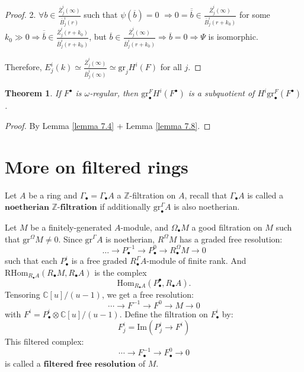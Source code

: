 \documentclass[openany]{book}
\newtheorem{theorem}{Theorem}[chapter] %
\theoremstyle{definition} %
\theoremstyle{remark}
\begin{document}
\begin{proof}
    2. $\forall b \in \frac{\overline{Z}_j^i(\infty)}{\overline{B}_j^i(r)}$ such that $\psi(\overline{b}) = 0$ $\Rightarrow0= \overline{\overline{b} }\in \frac{\overline{Z}_j^i(\infty)}{\overline{B}_j^i(r+k_0)}$ for some $k_0 \gg 0\Rightarrow \overline{\overline{b}} \in \frac{\overline{Z}_j^i(r+k_0)}{\overline{B}_j^i(r+k_0)}$, but $\overline{b} \in \frac{\overline{Z}_j^i(\infty)}{\overline{B}_j^i(r+k_0)} \Rightarrow \overline{b} = 0\Rightarrow \Psi$ is isomorphic.

    Therefore, $E_j^i(k)\simeq\frac{\overline{Z}^{i}_{j}(\infty)}{\overline{B}^{i}_{j}(\infty)} \simeq \mathrm{gr}_j H^i(F) $ for all $j$.
\end{proof}

\begin{theorem}\label{tehorem 7.9}
    If $F^\bullet$ is $\omega$-regular, then $\mathrm{gr}^F_{\bullet} H^{i}(F^{\bullet})$ is a subquotient of $H^{i} \mathrm{gr}^{F}_{\bullet }(F^{\bullet})$.
\end{theorem}
\begin{proof}
    By Lemma \ref{lemma 7.4} + Lemma \ref{lemma 7.8}.
\end{proof}

\section{More on filtered rings }

Let $A$ be a ring and $\Gamma_{\bullet} = \Gamma_{\bullet}A$ a $\mathbb{Z}$-filtration on $A$, recall that $\Gamma_{\bullet}A$ is called a $\textbf{noetherian } \mathbb{Z}\textbf{-filtration}$ if additionally $\mathrm{gr}^{\Gamma}_\bullet A$ is also noetherian.

Let $M$ be a finitely-generated $A$-module, and $\Omega_{\bullet}M$ a good filtration on $M$ such that $\mathrm{gr}^{\Omega} M \neq 0$.
Since $\mathrm{gr}^{\Gamma} A$ is noetherian, $R^{\Omega} M$ has a graded free resolution: $$\dots\rightarrow P_{\bullet}^{-1}\rightarrow P^{0}_{\bullet}\rightarrow R^{\Omega} _{\bullet}M\rightarrow0$$such that each $P^{i}_{\bullet}$ is a free graded $R_{\bullet}^{\Gamma}A$-module of finite rank.
And $\mathrm{RHom}_{R_{\bullet}A}(R_{\bullet}M, R_{\bullet}A)$ is the complex $$\mathrm{Hom}_{R_{\bullet}A}(P^{\bullet}_{\bullet}, R_{\bullet}A).$$
Tensoring $\mathbb{C}[u]/(u-1)$, we get a free resolution:
$$ \cdots \to F^{-1} \to F^0 \to M \to 0$$
with $F^i = P^i_{\bullet} \otimes \mathbb{C}[u]/(u-1)$.
Define the filtration on $F^i_{\bullet}$ by:$$F_j^i = \text{Im}(P_j^i \longrightarrow F^i)$$This filtered complex:$$\cdots \longrightarrow F_{\bullet}^{-1} \longrightarrow F_{\bullet}^0 \longrightarrow 0$$is called a $\textbf{filtered free resolution}$ of $M$.
\end{document}
